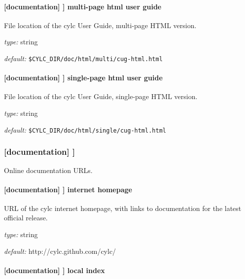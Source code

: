 \paragraph[multi-page html user guide]{[documentation] \textrightarrow [[files]] \textrightarrow multi-page html user guide }

File location of the cylc User Guide, multi-page HTML version.
\begin{myitemize}
\item {\em type:} string
\item {\em default:} \lstinline=$CYLC_DIR/doc/html/multi/cug-html.html=
\end{myitemize}

\paragraph[single-page html user guide]{[documentation] \textrightarrow [[files]] \textrightarrow single-page html user guide }

File location of the cylc User Guide, single-page HTML version.
\begin{myitemize}
\item {\em type:} string
\item {\em default:} \lstinline=$CYLC_DIR/doc/html/single/cug-html.html=
\end{myitemize}

\subsubsection[{[[}urls{]]}]{[documentation] \textrightarrow [[urls]]}

Online documentation URLs.

\paragraph[internet homepage]{[documentation] \textrightarrow [[urls]] \textrightarrow internet homepage }

URL of the cylc internet homepage, with links to documentation for the
latest official release.

\begin{myitemize}
\item {\em type:} string
\item {\em default:} http://cylc.github.com/cylc/
\end{myitemize}

\paragraph[local index]{[documentation] \textrightarrow [[urls]] \textrightarrow local index}

